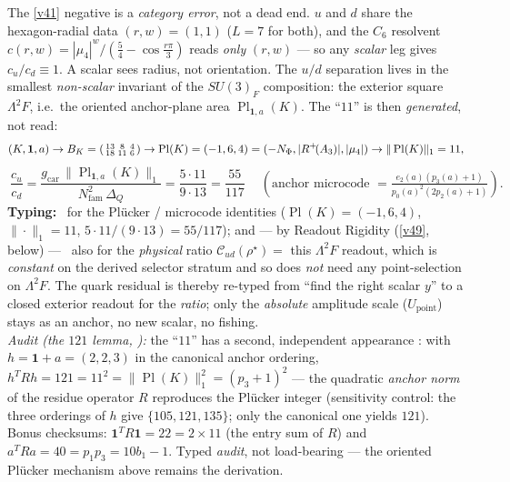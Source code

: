\documentclass[11pt,a4paper]{article}
\newcommand{\Nfam}{N_{\mathrm{fam}}}
\newcommand{\gcar}{g_{\mathrm{car}}}
\begin{document}
\begin{keybox}
The \vref{v41} negative is a \emph{category error}, not a dead end. $u$ and $d$ share the hexagon-radial data
$(r,w)=(1,1)$ ($L=7$ for both), and the $C_6$ resolvent $c(r,w)=|\mu_4|^w/(\tfrac54-\cos\tfrac{r\pi}3)$
reads \emph{only} $(r,w)$ --- so any \emph{scalar} leg gives $c_u/c_d\equiv1$. A scalar sees radius, not
orientation. The $u/d$ separation lives in the smallest \emph{non-scalar} invariant of the $SU(3)_F$
composition: the exterior square $\Lambda^2F$, i.e.\ the oriented anchor-plane area
$\operatorname{Pl}_{\mathbf1,a}(K)$. The ``$11$'' is then \emph{generated}, not read:
\[
  (K,\mathbf1,a)\to B_K=\begin{psmallmatrix}13&8&4\\18&11&6\end{psmallmatrix}\to
  \operatorname{Pl}(K)=(-1,6,4)=(-N_\Phi,|R^+\!(A_3)|,|\mu_4|)\to
  \|\operatorname{Pl}(K)\|_1=11,
\]
\[
  \boxed{\ \frac{c_u}{c_d}=\frac{\gcar\,\|\operatorname{Pl}_{\mathbf1,a}(K)\|_1}{\Nfam^2\,\Delta_Q}
  =\frac{5\cdot11}{9\cdot13}=\frac{55}{117}\ }
  \quad(\text{anchor microcode }=\tfrac{e_2(a)(p_3(a)+1)}{p_0(a)^2(2p_2(a)+1)}).
\]
\textbf{Typing:} \mE\ for the Plücker / microcode identities ($\operatorname{Pl}(K)=(-1,6,4)$,
$\|\cdot\|_1=11$, $5\cdot11/(9\cdot13)=55/117$); and --- by Readout Rigidity (\vref{v49}, below) --- \mE\ also for the
\emph{physical} ratio $\mathcal C_{ud}(\rho^\star)=$ this $\Lambda^2F$ readout, which is \emph{constant} on the
derived selector stratum and so does \emph{not} need any point-selection on $\Lambda^2F$. The quark residual is
thereby re-typed from ``find the right scalar $y$'' to a closed exterior readout for the \emph{ratio}; only the
\emph{absolute} amplitude scale ($U_{\mathrm{point}}$) stays as an anchor, no new scalar, no fishing.
\smallskip\\
\noindent\emph{Audit (the $121$ lemma, ):} the ``$11$'' has a second,
independent appearance \mE: with $h=\mathbf1+a=(2,2,3)$ in the canonical anchor ordering,
$h^TRh=121=11^2=\|\operatorname{Pl}(K)\|_1^2=(p_3+1)^2$ --- the quadratic \emph{anchor norm} of the
residue operator $R$ reproduces the Plücker integer (sensitivity control: the three orderings of $h$
give $\{105,121,135\}$; only the canonical one yields $121$). Bonus checksums:
$\mathbf1^TR\mathbf1=22=2\times11$ (the entry sum of $R$) and $a^TRa=40=p_1p_3=10b_1-1$. Typed
\emph{audit}, not load-bearing --- the oriented Plücker mechanism above remains the derivation.

\end{keybox}
\end{document}
